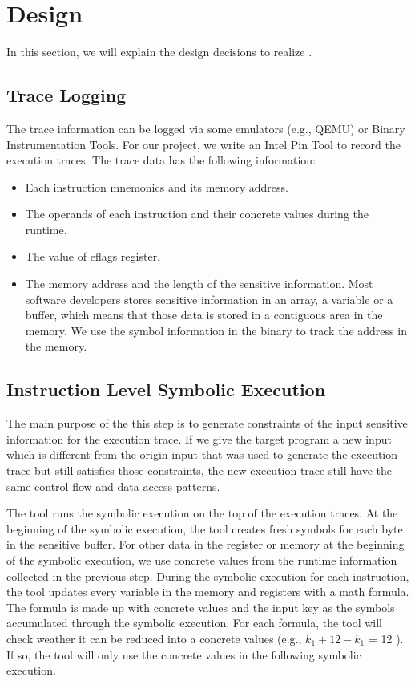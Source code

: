 \section{Design}
In this section, we will explain the design decisions to realize \tool{}. 


\subsection{Trace Logging}
The trace information can be logged via some emulators (e.g., QEMU) or 
Binary Instrumentation Tools. 
For our project, we write an Intel Pin Tool to record the execution traces. 
The trace data has the following information:
\begin{itemize}
    \item Each instruction mnemonics and its memory address.
    \item The operands of each instruction and their concrete values during the 
          runtime.
    \item The value of eflags register. 
    \item The memory address and the length of the sensitive information.
     Most software developers stores sensitive information in an array,
     a variable or a buffer, which means that those data is stored in a contiguous 
     area in the memory. We use the symbol information in the binary to track the 
     address in the memory.

\end{itemize}

\subsection{Instruction Level Symbolic Execution}
The main purpose of the this step is to generate 
constraints of the input sensitive information for the execution trace. 
If we give the target program a new input which 
is different from the origin input that was used 
to generate the execution trace but still satisfies those constraints,
the new execution trace still have the same control flow and 
data access patterns. 

The tool runs the symbolic execution on the top of the execution traces.
At the beginning of the symbolic execution, the tool creates fresh 
symbols for each byte in the sensitive buffer. For other data in the 
register or memory at the beginning of the symbolic execution,
we use concrete values from the runtime information collected in
the previous step. During the symbolic execution for each instruction, 
the tool updates every variable in the memory and registers with a
math formula. The formula is made up with concrete values and 
the input key as the symbols accumulated through the symbolic execution.
For each formula, the tool will check weather it can be reduced
into a concrete values (e.g., $k_1+12-k_1$ = 12 ). 
If so, the tool will only use the concrete values in the 
following symbolic execution.


